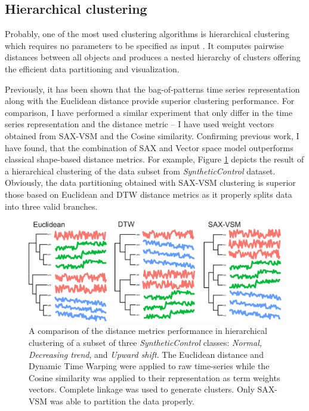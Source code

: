 \subsection{Hierarchical clustering}
Probably, one of the most used clustering algorithms is hierarchical clustering which requires no
parameters to be specified as input \cite{citeulike:1576606}. It computes pairwise distances between all objects 
and produces a nested hierarchy of clusters offering the efficient data partitioning and visualization. 

Previously, it has been shown that the bag-of-patterns time series representation along with the Euclidean distance
provide superior clustering performance\cite{citeulike:10525778}. 
For comparison, I have performed a similar experiment that only differ in the time series representation and
the distance metric -- I have used \tfidf weight vectors obtained from SAX-VSM and the Cosine similarity. 
Confirming previous work, I have found, that the combination of SAX and Vector space model outperforms 
classical shape-based distance metrics. 
For example, Figure \ref{fig:hc} depicts the result of a hierarchical clustering of the data subset from 
\textit{SyntheticControl} dataset. 
Obviously, the data partitioning obtained with SAX-VSM clustering is superior those based on Euclidean and DTW 
distance metrics as it properly splits data into three valid branches.

\begin{figure}[!h!t]
   \centering
   \includegraphics[width=120mm]{figures/clustering.eps}
   \caption{A comparison of the distance metrics performance in hierarchical clustering of a subset of three
   \textit{SyntheticControl} classes: \textit{Normal, Decreasing trend}, and \textit{Upward shift}. 
   The Euclidean distance and Dynamic Time Warping were applied to raw time-series while the Cosine similarity 
   was applied to their representation as term weights vectors. Complete linkage was used to generate clusters. 
   Only SAX-VSM was able to partition the data properly.   }
   \label{fig:hc}
\end{figure}

